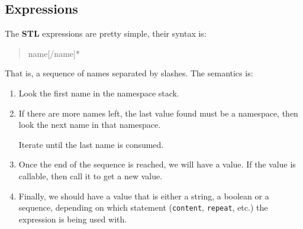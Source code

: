\subsection{Expressions}

The {\bf STL} expressions are pretty simple, their syntax is:

\begin{quote}
    name[/name]*
\end{quote}

That is, a sequence of names separated by slashes. The semantics is:

\begin{enumerate}
  \item Look the first name in the namespace stack.

  \item If there are more names left, the last value found must be a namespace,
    then look the next name in that namespace.

    Iterate until the last name is consumed.

  \item Once the end of the sequence is reached, we will have a value. If
    the value is callable, then call it to get a new value.

  \item Finally, we should have a value that is either a string, a boolean
    or a sequence, depending on which statement ({\tt content}, {\tt repeat},
    etc.) the expression is being used with.
\end{enumerate}



